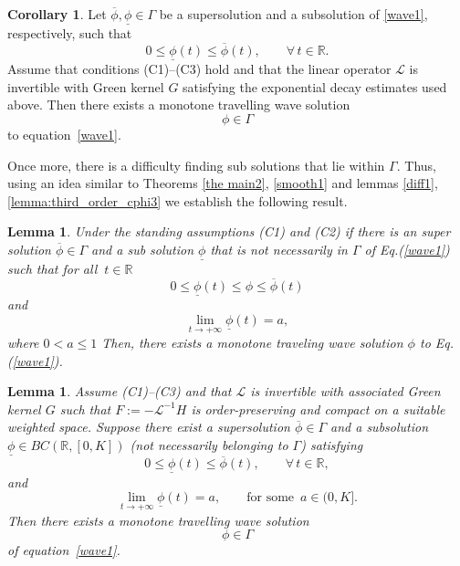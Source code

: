 \documentclass[12pt,letterpaper]{amsart}
\def\R{\mathbb R}
\newtheorem{lemma}[theorem]{Lemma}
\theoremstyle{definition}
\newtheorem{corollary}[theorem]{Corollary}
\theoremstyle{remark}
\numberwithin{equation}{section}
\begin{document}
\begin{corollary}\label{cor:existence_Gamma}
	Let $\overline{\phi},\underline{\phi}\in\Gamma$ be a supersolution and a subsolution of \eqref{wave1}, respectively, such that
	\[
	0 \le \underline{\phi}(t) \le \overline{\phi}(t), \qquad \forall\, t \in \mathbb{R}.
	\]
	Assume that conditions \textnormal{(C1)--(C3)} hold and that the linear operator $\mathcal{L}$ is invertible with Green kernel $G$ satisfying the exponential decay estimates used above. Then there exists a monotone travelling wave solution 
	\[
	\phi \in \Gamma
	\]
	to equation~\eqref{wave1}.
\end{corollary}
 
Once more, there is a difficulty finding sub solutions that lie within $\Gamma.$ Thus, using an idea similar to Theorems \ref{the main2}, \ref{smooth1} and lemmas \ref{diff1}, \ref{lemma:third_order_cphi3}  we establish the following result.  




 \begin{lemma}\label{the main3}
Under the standing assumptions (C1) and (C2) if there is an super solution $\overline{\phi} \in \Gamma$ and a sub solution $\underline{\phi}$
that is not necessarily in $\Gamma$ of Eq.(\ref{wave1}) such that for all $ \ t\in \R $
$$
0\le  \underline{\phi}(t)\le\phi\le \overline{\phi}(t) 
$$
and 
$$
\lim_{t\to+\infty} \underline{\phi}(t)=a,
$$ where $0<a\le 1$
Then, there exists a monotone traveling wave solution $\phi$ to Eq.(\ref{wave1}).
\end{lemma}
\begin{lemma}\label{lem:main3}
	Assume \textnormal{(C1)--(C3)} and that $\mathcal{L}$ is invertible with associated Green kernel $G$ such that $F:=-\mathcal{L}^{-1}H$ is order-preserving and compact on a suitable weighted space. 
	Suppose there exist a supersolution $\overline{\phi}\in\Gamma$ and a subsolution 
	\(
	\underline{\phi} \in BC(\mathbb{R},[0,K])
	\)
	(not necessarily belonging to $\Gamma$) satisfying
	\[
	0 \le \underline{\phi}(t) \le \overline{\phi}(t), \qquad \forall\, t \in \mathbb{R},
	\]
	and
	\[
	\lim_{t\to +\infty} \underline{\phi}(t) = a,
	\qquad \text{for some }\, a \in (0,K].
	\]
	Then there exists a monotone travelling wave solution 
	\[
	\phi \in \Gamma
	\]
	of equation~\eqref{wave1}.
\end{lemma}
\end{document}
